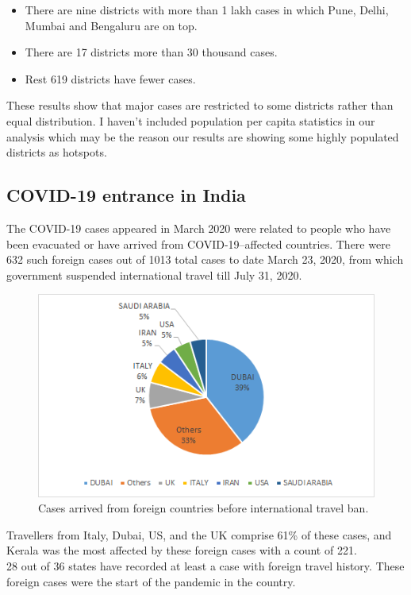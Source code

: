 \documentclass{article}
\begin{document}
\begin{itemize}
    \item There are nine districts with more than 1 lakh cases in which Pune, Delhi, Mumbai and Bengaluru are on top. 
   \item There are 17 districts more than 30 thousand cases.
   \item Rest 619 districts have fewer cases.
\end{itemize}
These results show that major cases are restricted to some districts rather than equal distribution. I haven't included population per capita statistics in our analysis which may be the reason our results are showing some highly populated districts as hotspots. 

\subsection{COVID-19 entrance in India}
The COVID-19 cases appeared in March 2020 were related to people who have been evacuated or have arrived from COVID-19–affected countries. There were  632 such foreign cases out of 1013 total cases to date March 23, 2020, from which government suspended international travel till July 31, 2020.

\begin{figure}[h]
    \centering
    \includegraphics{Fig1}
    \caption{Cases arrived from foreign countries before international travel ban.}
\end{figure}
\pagebreak

Travellers from Italy, Dubai, US, and the UK comprise 61\% of these cases, and Kerala was the most affected by these foreign cases with a count of 221.\\ 28 out of 36 states have recorded at least a case with foreign travel history. These foreign cases were the start of the pandemic in the country. 
\end{document}
